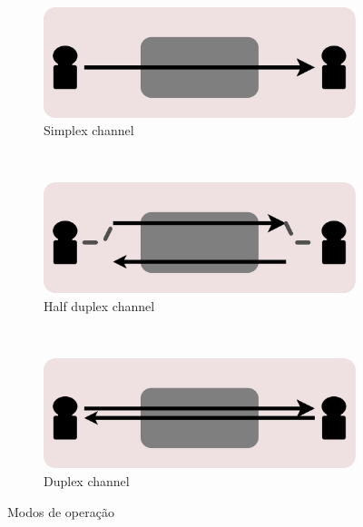 \documentclass[a4paper,10pt]{article}
\begin{document}
\begin{figure}[ht!]
    \centering
    \begin{subfigure}[b]{0.3\textwidth}
        \includegraphics[width=\textwidth]{channel-simplex.eps}
        \caption{Simplex channel}
        \label{fig:channelsimplex}
    \end{subfigure}
    ~ %
    \begin{subfigure}[b]{0.3\textwidth}
        \includegraphics[width=\textwidth]{channel-halfduplex.eps}
        \caption{Half duplex channel}
        \label{fig:channelhalfduplex}
    \end{subfigure}
    ~ %
    \begin{subfigure}[b]{0.3\textwidth}
        \includegraphics[width=\textwidth]{channel-duplex.eps}
        \caption{Duplex channel}
        \label{fig:channelduplex}
    \end{subfigure}
    \caption{Modos de operação}\label{fig:channeltypes}
\end{figure}
\end{document}
